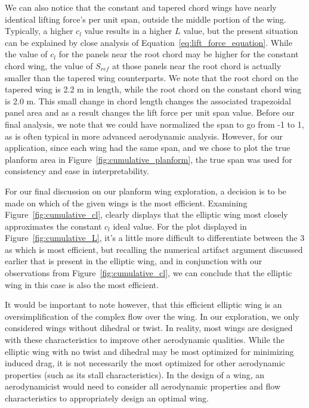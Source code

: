 \documentclass{report}
\begin{document}
We can also notice that the constant and tapered chord wings have nearly identical lifting force's per unit span, outside the middle portion of the wing.
Typically, a higher $c_l$ value results in a higher $L$ value, but the present situation can be explained by close analysis of Equation~\ref{eq:lift_force_equation}.
While the value of $c_l$ for the panels near the root chord may be higher for the constant chord wing, the value of $S_{ref}$ at those panels near the root chord is actually smaller than the tapered wing counterparts.
We note that the root chord on the tapered wing is 2.2 m in length, while the root chord on the constant chord wing is 2.0 m. This small change in chord length changes the associated trapezoidal panel area and as a result changes the lift force per unit span value.
Before our final analysis, we note that we could have normalized the span to go from -1 to 1, as is often typical in more advanced aerodynamic analysis. However, for our application, since each wing had the same span, and we chose to plot the true planform area in Figure~\ref{fig:cumulative_planform}, the true span was used for consistency and ease in interpretability.


For our final discussion on our planform wing exploration, a decision is to be made on which of the given wings is the most efficient.
Examining Figure~\ref{fig:cumulative_cl}, clearly displays that the elliptic wing most closely approximates the constant $c_l$ ideal value.
For the plot displayed in Figure~\ref{fig:cumulative_L}, it's a little more difficult to differentiate between the 3 as which is most efficient, 
but recalling the numerical artifact argument discussed earlier that is present in the elliptic wing, and in conjunction with our observations from Figure~\ref{fig:cumulative_cl}, we can conclude that the elliptic wing in this case is also the most efficient.

It would be important to note however, that this efficient elliptic wing is an oversimplification of the complex flow over the wing.
In our exploration, we only considered wings without dihedral or twist. In reality, most wings are designed with these characteristics to improve other aerodynamic qualities.
While the elliptic wing with no twist and dihedral may be most optimized for minimizing induced drag, it is not necessarily the most optimized for other aerodynamic properties (such as its stall characteristics).
In the design of a wing, an aerodynamicist would need to consider all aerodynamic properties and flow characteristics to appropriately design an optimal wing.
\end{document}
